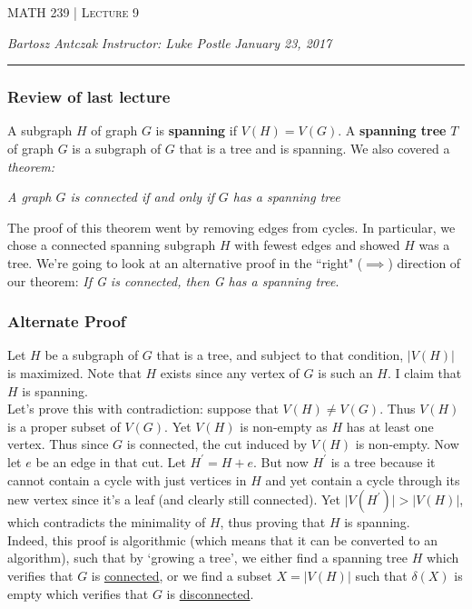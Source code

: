 \documentclass{report}
\newcommand{\lectureNum}{9}
\newcommand{\curDate}{January 23, 2017}
\newcommand{\course}{MATH 239}
\newcommand{\instructor}{Luke Postle}
\begin{document}
\begin{center}
\begin{Large}
\textsc{\course{} | Lecture \lectureNum{}}
\end{Large}
\end{center} 
\noindent \textit{Bartosz Antczak} \hfill
\textit{Instructor: \instructor{}} \hfill
\textit{\curDate{}}
\rule{\textwidth}{0.4pt}

\subsubsection{Review of last lecture}
A subgraph $H$ of graph $G$ is \textbf{spanning} if $V(H) = V(G)$. A \textbf{spanning tree} $T$ of graph $G$ is a subgraph of $G$ that is a tree and is spanning. We also covered a \textit{theorem:}
\begin{center}
\textit{A graph $G$ is connected if and only if $G$ has a spanning tree}
\end{center}
The proof of this theorem went by removing edges from cycles. In particular, we chose a connected spanning subgraph $H$ with fewest edges and showed $H$ was a tree. We're going to look at an alternative proof in the ``right" ($\implies$) direction of our theorem: \textit{If G is connected, then G has a spanning tree}.
\subsubsection{Alternate Proof}
Let $H$ be a subgraph of $G$ that is a tree, and subject to that condition, $\vert V(H)\vert$ is maximized. Note that $H$ exists since any vertex of $G$ is such an $H$. I claim that $H$ is spanning. \\
Let's prove this with contradiction: suppose that $V(H) \neq V(G)$. Thus $V(H)$ is a proper subset of $V(G)$. Yet $V(H)$ is non-empty as $H$ has at least one vertex. Thus since $G$ is connected, the cut induced by $V(H)$ is non-empty. Now let $e$ be an edge in that cut. Let $H^\prime = H + e$. But now $H^\prime$ is a tree because it cannot contain a cycle with just vertices in $H$ and yet contain a cycle through its new vertex since it's a leaf (and clearly still connected). Yet $\vert V(H^\prime) \vert > \vert V(H) \vert$, which contradicts the minimality of $H$, thus proving that $H$ is spanning.\\
Indeed, this proof is algorithmic (which means that it can be converted to an algorithm), such that by `growing a tree', we either find a spanning tree $H$ which verifies that $G$ is \underline{connected}, or we find a subset $X = \vert V(H) \vert$ such that $\delta(X)$ is empty which verifies that $G$ is \underline{disconnected}.
\end{document}
